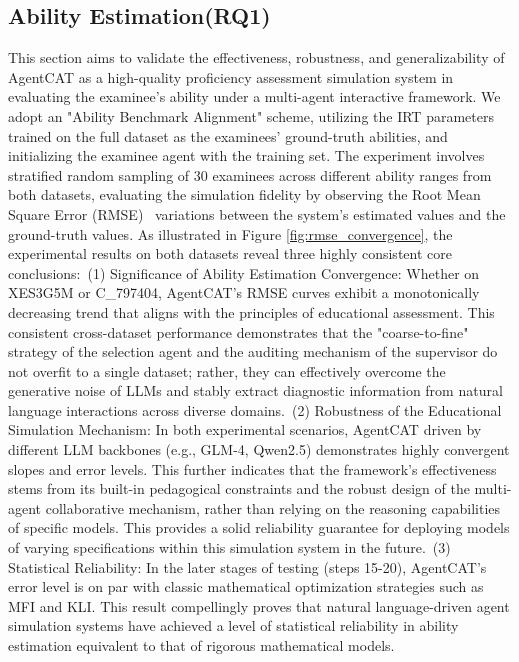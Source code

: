 \subsection{Ability Estimation(RQ1)}
This section aims to validate the effectiveness, robustness, and generalizability of AgentCAT as a high-quality proficiency assessment simulation system in evaluating the examinee's ability under a multi-agent interactive framework. We adopt an "Ability Benchmark Alignment" scheme, utilizing the IRT parameters trained on the full dataset as the examinees' ground-truth abilities, and initializing the examinee agent with the training set. The experiment involves stratified random sampling of 30 examinees across different ability ranges from both datasets, evaluating the simulation fidelity by observing the Root Mean Square Error (RMSE)~\cite{wang1998properties} variations between the system's estimated values and the ground-truth values. As illustrated in Figure \ref{fig:rmse_convergence}, the experimental results on both datasets reveal three highly consistent core conclusions:~(1) Significance of Ability Estimation Convergence: Whether on XES3G5M or C\_797404, AgentCAT's RMSE curves exhibit a monotonically decreasing trend that aligns with the principles of educational assessment. This consistent cross-dataset performance demonstrates that the "coarse-to-fine" strategy of the selection agent and the auditing mechanism of the supervisor do not overfit to a single dataset; rather, they can effectively overcome the generative noise of LLMs and stably extract diagnostic information from natural language interactions across diverse domains.~(2) Robustness of the Educational Simulation Mechanism: In both experimental scenarios, AgentCAT driven by different LLM backbones (e.g., GLM-4, Qwen2.5) demonstrates highly convergent slopes and error levels. This further indicates that the framework's effectiveness stems from its built-in pedagogical constraints and the robust design of the multi-agent collaborative mechanism, rather than relying on the reasoning capabilities of specific models. This provides a solid reliability guarantee for deploying models of varying specifications within this simulation system in the future.~(3) Statistical Reliability: In the later stages of testing (steps 15-20), AgentCAT's error level is on par with classic mathematical optimization strategies such as MFI and KLI. This result compellingly proves that natural language-driven agent simulation systems have achieved a level of statistical reliability in ability estimation equivalent to that of rigorous mathematical models.



